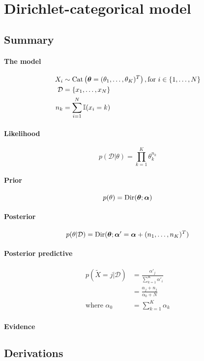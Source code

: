 \section{Dirichlet-categorical model}
\subsection{Summary}
\paragraph{The model}
    \begin{align}
        X_i         &\sim \operatorname{Cat}\left(\boldsymbol{\mathbf{\theta}} = (\theta_1, \dotsc, \theta_K)^T\right), \text{for } i \in \{1, \dotsc, N\} \\
        \mathcal D  &= \{x_1, \dotsc, x_N\} \\
        n_k         &= \sum_{i = 1}^N \mathbb I (x_i = k)
    \end{align}

\paragraph{Likelihood}
    \begin{equation}
        p(\mathcal D | \theta) = \prod_{k = 1}^K \theta_k^{n_k}
    \end{equation}

\paragraph{Prior}
    \begin{equation}
        p(\theta)   = \operatorname{Dir}(\boldsymbol{\mathbf{\theta}}; \boldsymbol{\mathbf{\alpha}})
    \end{equation}

\paragraph{Posterior}
    \begin{equation}
        p(\theta | \mathcal D) = \operatorname{Dir}(\boldsymbol{\mathbf{\theta}}; \boldsymbol{\mathbf{\alpha}}' = \boldsymbol{\mathbf{\alpha}} + (n_1, \dotsc, n_K)^T)
    \end{equation}

\paragraph{Posterior predictive}
    \begin{align}
        p(\tilde X = j | \mathcal D)   &= \frac{\alpha'_j}{\sum_{k = 1}^K \alpha'_i} \\
                                &= \frac{\alpha_j + n_j}{\alpha_0 + N} \\
        \text{where } \alpha_0  &= \sum_{k = 1}^K \alpha_k
    \end{align}

\paragraph{Evidence}

\subsection{Derivations}
